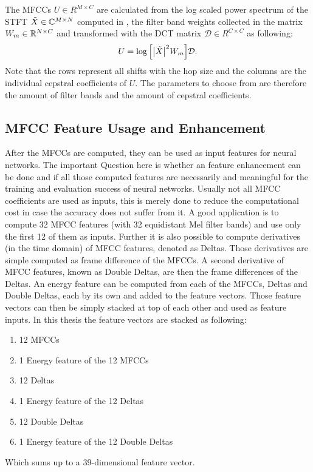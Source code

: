 \FloatBarrier
\noindent
The MFCCs $U \in R^{M \times C}$ are calculated from the log scaled power spectrum of the STFT $\tilde{X} \in \mathbb{C}^{M \times N}$ computed in , the filter band weights collected in the matrix $W_m \in \mathbb{R}^{N \times C}$ and transformed with the DCT matrix $\mathcal{D} \in R^{C \times C}$ as following:
\begin{equation}
    U = \log{ \left[ \abs{\tilde{X}}^2 W_m \right] } \mathcal{D}.
\end{equation}
Note that the rows represent all shifts with the hop size and the columns are the individual cepstral coefficients of $U$.
The parameters to choose from are therefore the amount of filter bands and the amount of cepstral coefficients.



\subsection{MFCC Feature Usage and Enhancement}
After the MFCCs are computed, they can be used as input features for neural networks.
The important Question here is whether an feature enhancement can be done and if all those computed features are necessarily and meaningful for the training and evaluation success of neural networks. Usually not all MFCC coefficients are used as inputs, this is merely done to reduce the computational cost in case the accuracy does not suffer from it.
A good application is to compute 32 MFCC features (with 32 equidistant Mel filter bands) and use only the first 12 of them as inputs.
Further it is also possible to compute derivatives (in the time domain) of MFCC features, denoted as Deltas. 
Those derivatives are simple computed as frame difference of the MFCCs.
A second derivative of MFCC features, known as Double Deltas, are then the frame differences of the Deltas.
An energy feature can be computed from each of the MFCCs, Deltas and Double Deltas, each by its own and added to the feature vectors.
Those feature vectors can then be simply stacked at top of each other and used as feature inputs.
In this thesis the feature vectors are stacked as following:
\begin{enumerate}
    \item 12 MFCCs
    \item 1 Energy feature of the 12 MFCCs
    \item 12 Deltas
    \item 1 Energy feature of the 12 Deltas
    \item 12 Double Deltas
    \item 1 Energy feature of the 12 Double Deltas
\end{enumerate}
Which sums up to a 39-dimensional feature vector.

